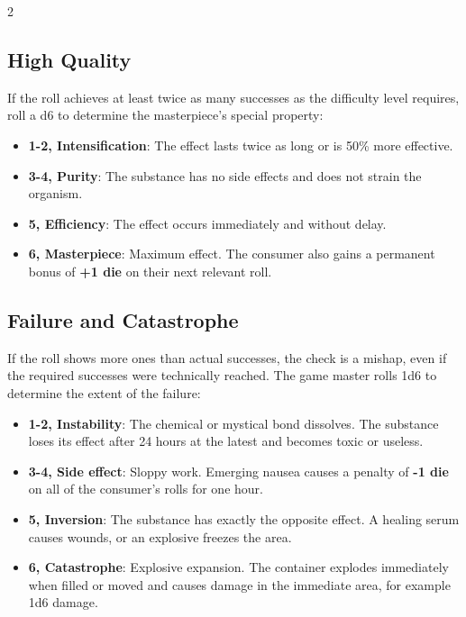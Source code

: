 \begin{multicols}{2}
\subsection{High Quality}

If the roll achieves at least twice as many successes as the difficulty level requires, roll a d6 to determine the masterpiece's special property:

\begin{itemize}
    \item \textbf{1-2, Intensification}: The effect lasts twice as long or is 50\% more effective.
    \item \textbf{3-4, Purity}: The substance has no side effects and does not strain the organism.
    \item \textbf{5, Efficiency}: The effect occurs immediately and without delay.
    \item \textbf{6, Masterpiece}: Maximum effect. The consumer also gains a permanent bonus of \textbf{+1 die} on their next relevant roll.
\end{itemize}

\subsection{Failure and Catastrophe}

If the roll shows more ones than actual successes, the check is a mishap, even if the required successes were technically reached. The game master rolls 1d6 to determine the extent of the failure:

\begin{itemize}
    \item \textbf{1-2, Instability}: The chemical or mystical bond dissolves. The substance loses its effect after 24 hours at the latest and becomes toxic or useless.
    \item \textbf{3-4, Side effect}: Sloppy work. Emerging nausea causes a penalty of \textbf{-1 die} on all of the consumer's rolls for one hour.
    \item \textbf{5, Inversion}: The substance has exactly the opposite effect. A healing serum causes wounds, or an explosive freezes the area.
    \item \textbf{6, Catastrophe}: Explosive expansion. The container explodes immediately when filled or moved and causes damage in the immediate area, for example 1d6 damage.
\end{itemize}


\end{multicols}
